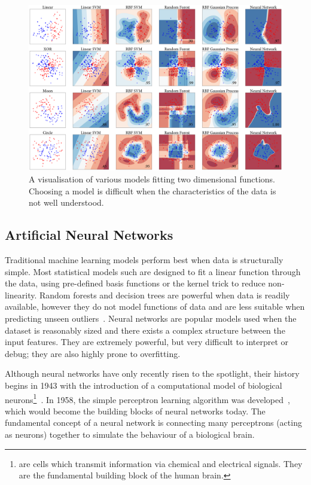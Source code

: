 \documentclass[12pt, twoside]{book}
\renewcommand\emph[1]{\textit{\color{USred}{#1}}}
\begin{document}
\begin{figure}[h]
	\label{modelvis}
	\centerline{\centering\includegraphics[width=1.2\linewidth]{model_vis.png}}
	\caption{A visualisation of various models fitting two dimensional functions. Choosing a model is difficult when the characteristics of the data is not well understood.}
\end{figure}

\subsection{Artificial Neural Networks}

 
Traditional machine learning models perform best when data is structurally simple. Most statistical models such are designed to fit a linear function through the data, using pre-defined basis functions or the kernel trick to reduce non-linearity. Random forests and decision trees are powerful when data is readily available, however they do not model functions of data and are less suitable when predicting unseen outliers~\cite{kramer2001propositionalization}. Neural networks are popular models used when the dataset is reasonably sized and there exists a complex structure between the input features. They are extremely powerful, but very difficult to interpret or debug; they are also highly prone to overfitting.
 
\label{neuralnetworkintro}Although neural networks have only recently risen to the spotlight, their history begins in 1943 with the introduction of a computational model of biological neurons\footnote{\emph{Neurons} are cells which transmit information via chemical and electrical signals. They are the fundamental building block of the human brain.}~\cite{nn1943}.
In 1958, the simple perceptron learning algorithm was developed~\cite{rosenblatt1958perceptron}, which would become the building blocks of neural networks today. The fundamental concept of a neural network is connecting many perceptrons (acting as neurons) together to simulate the behaviour of a biological brain. 
\end{document}
